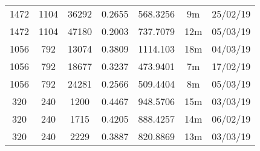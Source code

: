 \begin{center}
\begin{tabular}{ c c c | c | c c c }
  1472 & 1104 & 36292 & 0.2655 & 568.3256 & 9m & 25/02/19 \\
  1472 & 1104 & 47180 & 0.2003 & 737.7079 & 12m & 05/03/19 \\
  1056 & 792 & 13074 & 0.3809 & 1114.103 & 18m & 04/03/19 \\
  1056 & 792 & 18677 & 0.3237 & 473.9401 & 7m & 17/02/19 \\
  1056 & 792 & 24281 & 0.2566 & 509.4404 & 8m & 05/03/19 \\
  320 & 240 & 1200 & 0.4467 & 948.5706 & 15m & 03/03/19 \\
  320 & 240 & 1715 & 0.4205 & 888.4257 & 14m & 06/02/19 \\
  320 & 240 & 2229 & 0.3887 & 820.8869 & 13m & 03/03/19 \\
  \end{tabular}
  \end{center}